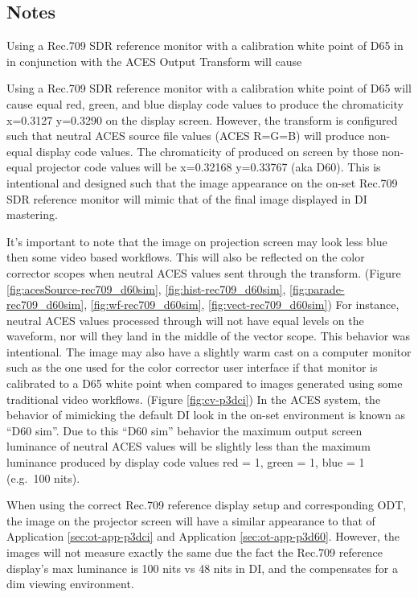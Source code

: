 \subsection{Notes}
\label{subsec:notes-rec709d60sim}

Using a Rec.709 SDR reference monitor with a calibration white point of D65 in in conjunction with the ACES Output Transform \texttt{} will cause 

Using a Rec.709 SDR reference monitor with a calibration white point of D65 will cause
equal red, green, and blue display code values to produce the
chromaticity x=0.3127 y=0.3290 on the display screen. However, the
\texttt{} transform is configured such that neutral ACES source file values (ACES R=G=B) will produce non-equal
display code values. The chromaticity of produced on screen by those
non-equal projector code values will be x=0.32168 y=0.33767 (aka D60).  This is intentional and designed such that the image appearance on the on-set Rec.709 SDR reference monitor will mimic that of the final image displayed in DI mastering.

It's important to note that the image on projection screen may look less blue then some video based workflows. This will also be reflected on the color
corrector scopes when neutral ACES values sent through the
\texttt{} transform. (Figure \ref{fig:acesSource-rec709_d60sim}, \ref{fig:hist-rec709_d60sim}, \ref{fig:parade-rec709_d60sim}, \ref{fig:wf-rec709_d60sim}, \ref{fig:vect-rec709_d60sim}) For instance,
neutral ACES values processed through
\texttt{} will not have equal levels on
the waveform, nor will they land in the middle of the vector scope. This behavior was intentional. The image may also
have a slightly warm cast on a computer monitor such as the one
used for the color corrector user interface if that monitor is
calibrated to a D65 white point when compared to images generated using some traditional video workflows. (Figure \ref{fig:cv-p3dci}) In the ACES system, the behavior of mimicking the default DI look in the on-set environment is known as ``D60 sim''. Due to this ``D60 sim'' behavior the maximum output screen luminance of neutral ACES values will be
slightly less than the maximum luminance produced by display code
values red = 1, green = 1, blue = 1 (e.g.~100 nits).

When using the correct Rec.709 reference display setup and corresponding ODT, the image
on the projector screen will have a similar appearance to that of Application \ref{sec:ot-app-p3dci} and Application \ref{sec:ot-app-p3d60}.  However, the images will not measure exactly the same due the fact the Rec.709 reference display's max luminance is 100 nits vs 48 nits in DI, and the \texttt{} compensates for a dim viewing environment.

